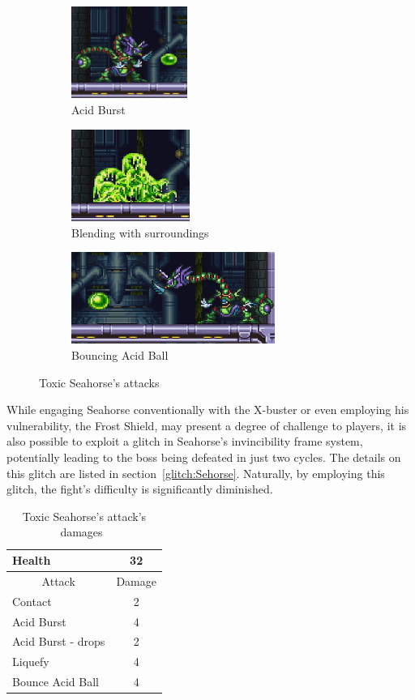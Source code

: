 \begin{figure}[htp]
	\centering
	\begin{subfigure}{.4\linewidth}
		\centering
		\includegraphics[height=3cm]{figures/X3/Toxic_seahorse/Seahorse_acid.jpg}
		\caption{Acid Burst}
	\end{subfigure}
	\begin{subfigure}{.4\linewidth}
		\centering
		\includegraphics[height=3cm]{figures/X3/Toxic_seahorse/Seahorse_blend.jpg}
		\caption{Blending with surroundings}
	\end{subfigure}
	\begin{subfigure}{\linewidth}
		\centering
		\includegraphics[height=3cm]{figures/X3/Toxic_seahorse/Seahorse_double.jpg}
		\caption{Bouncing Acid Ball}
	\end{subfigure}
	\caption{Toxic Seahorse's attacks}
	
\end{figure}

While engaging Seahorse conventionally with the X-buster or even employing his vulnerability, the Frost Shield, may present a degree of challenge to players, it is also possible to exploit a glitch in Seahorse's invincibility frame system, potentially leading to the boss being defeated in just two cycles. The details on this glitch are listed in section~\ref{glitch:Sehorse}.
Naturally, by employing this glitch, the fight's difficulty is significantly diminished.
\begin{table}[htp]
	\centering
	\begin{tabular}[h]{l c}
		\toprule
		Health  & 32\\
		\midrule
		\multicolumn{1}{c}{Attack} & \multicolumn{1}{c}{Damage}\\
		Contact & 2\\
		Acid Burst & 4\\
		Acid Burst - drops& 2\\
		Liquefy & 4\\
		Bounce Acid Ball& 4\\
		\bottomrule
	\end{tabular}
	\caption{Toxic Seahorse's attack's damages~\cite{wiki:Toxic_seahorse,book:Compendium}}
\end{table} 

